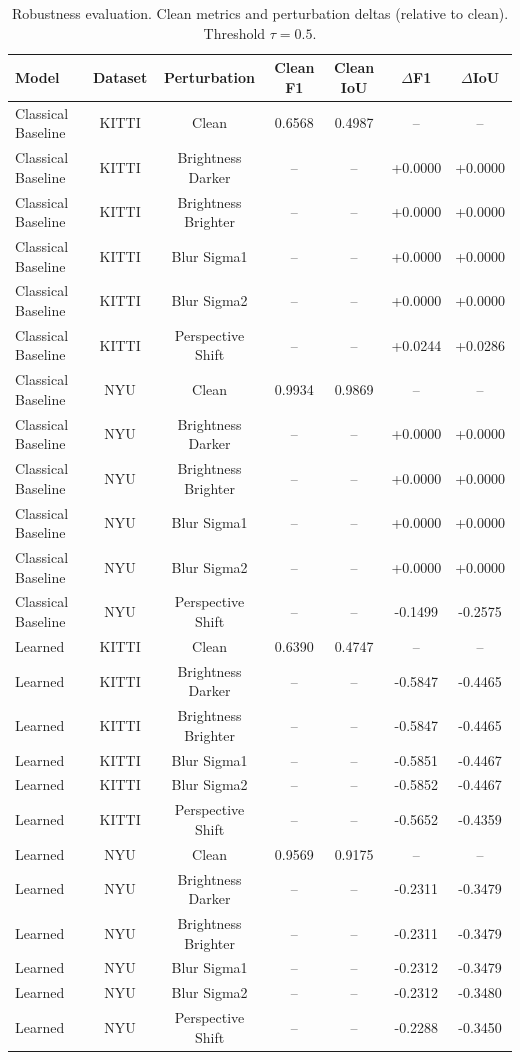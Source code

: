 \begin{table}[H]
  \centering
  \caption{Robustness evaluation. Clean metrics and perturbation deltas (relative to clean). Threshold $\tau=0.5$.}
  \label{\robustnessLabel}
  \begin{tabular}{lcccccc}
    \toprule
    Model & Dataset & Perturbation & Clean F1 & Clean IoU & $\Delta$F1 & $\Delta$IoU \\ 
    \midrule
    Classical Baseline & KITTI & Clean & 0.6568 & 0.4987 & -- & -- \\
    Classical Baseline & KITTI & Brightness Darker & -- & -- & +0.0000 & +0.0000 \\
    Classical Baseline & KITTI & Brightness Brighter & -- & -- & +0.0000 & +0.0000 \\
    Classical Baseline & KITTI & Blur Sigma1 & -- & -- & +0.0000 & +0.0000 \\
    Classical Baseline & KITTI & Blur Sigma2 & -- & -- & +0.0000 & +0.0000 \\
    Classical Baseline & KITTI & Perspective Shift & -- & -- & +0.0244 & +0.0286 \\
    Classical Baseline & NYU & Clean & 0.9934 & 0.9869 & -- & -- \\
    Classical Baseline & NYU & Brightness Darker & -- & -- & +0.0000 & +0.0000 \\
    Classical Baseline & NYU & Brightness Brighter & -- & -- & +0.0000 & +0.0000 \\
    Classical Baseline & NYU & Blur Sigma1 & -- & -- & +0.0000 & +0.0000 \\
    Classical Baseline & NYU & Blur Sigma2 & -- & -- & +0.0000 & +0.0000 \\
    Classical Baseline & NYU & Perspective Shift & -- & -- & -0.1499 & -0.2575 \\
    Learned & KITTI & Clean & 0.6390 & 0.4747 & -- & -- \\
    Learned & KITTI & Brightness Darker & -- & -- & -0.5847 & -0.4465 \\
    Learned & KITTI & Brightness Brighter & -- & -- & -0.5847 & -0.4465 \\
    Learned & KITTI & Blur Sigma1 & -- & -- & -0.5851 & -0.4467 \\
    Learned & KITTI & Blur Sigma2 & -- & -- & -0.5852 & -0.4467 \\
    Learned & KITTI & Perspective Shift & -- & -- & -0.5652 & -0.4359 \\
    Learned & NYU & Clean & 0.9569 & 0.9175 & -- & -- \\
    Learned & NYU & Brightness Darker & -- & -- & -0.2311 & -0.3479 \\
    Learned & NYU & Brightness Brighter & -- & -- & -0.2311 & -0.3479 \\
    Learned & NYU & Blur Sigma1 & -- & -- & -0.2312 & -0.3479 \\
    Learned & NYU & Blur Sigma2 & -- & -- & -0.2312 & -0.3480 \\
    Learned & NYU & Perspective Shift & -- & -- & -0.2288 & -0.3450 \\
    \bottomrule
  \end{tabular}
\end{table}
